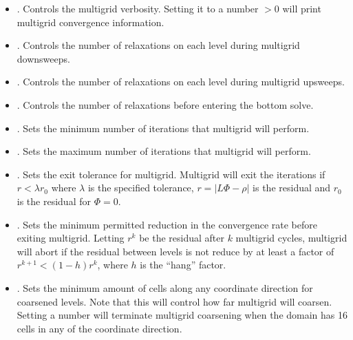 \documentclass[letterpaper,10pt,english]{sphinxmanual}
\begin{document}
\begin{itemize}
\item {} 
\sphinxAtStartPar
{}.
Controls the multigrid verbosity.
Setting it to a number \(> 0\) will print multigrid convergence information.

\item {} 
\sphinxAtStartPar
{}.
Controls the number of relaxations on each level during multigrid downsweeps.

\item {} 
\sphinxAtStartPar
{}.
Controls the number of relaxations on each level during multigrid upsweeps.

\item {} 
\sphinxAtStartPar
{}.
Controls the number of relaxations before entering the bottom solve.

\item {} 
\sphinxAtStartPar
{}.
Sets the minimum number of iterations that multigrid will perform.

\item {} 
\sphinxAtStartPar
{}.
Sets the maximum number of iterations that multigrid will perform.

\item {} 
\sphinxAtStartPar
{}.
Sets the exit tolerance for multigrid.
Multigrid will exit the iterations if \(r < \lambda r_0\) where \(\lambda\) is the specified tolerance, \(r = |L\Phi -\rho|\) is the residual and \(r_0\) is the residual for \(\Phi = 0\).

\item {} 
\sphinxAtStartPar
{}.
Sets the minimum permitted reduction in the convergence rate before exiting multigrid.
Letting \(r^k\) be the residual after \(k\) multigrid cycles, multigrid will abort if the residual between levels is not reduce by at least a factor of \(r^{k+1} < (1-h)r^k\), where \(h\) is the “hang” factor.

\item {} 
\sphinxAtStartPar
{}.
Sets the minimum amount of cells along any coordinate direction for coarsened levels.
Note that this will control how far multigrid will coarsen. Setting a number  will terminate multigrid coarsening when the domain has 16 cells in any of the coordinate direction.


\end{itemize}
\end{document}
